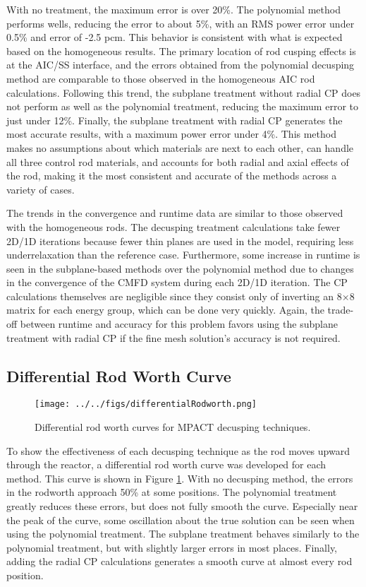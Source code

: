 With no treatment, the maximum error is over 20\%.  The polynomial method performs wells, reducing the error to about 5\%, with an RMS power error under 0.5\% and \keff{} error of -2.5 pcm.  This behavior is consistent with what is expected based on the homogeneous results.  The primary location of rod cusping effects is at the AIC/SS interface, and the errors obtained from the polynomial decusping method are comparable to those observed in the homogeneous AIC rod calculations.  Following this trend, the subplane treatment without radial CP does not perform as well as the polynomial treatment, reducing the maximum error to just under 12\%.  Finally, the subplane treatment with radial CP generates the most accurate results, with a maximum power error under 4\%.  This method makes no assumptions about which materials are next to each other, can handle all three control rod materials, and accounts for both radial and axial effects of the rod, making it the most consistent and accurate of the methods across a variety of cases.

The trends in the convergence and runtime data are similar to those observed with the homogeneous rods.  The decusping treatment calculations take fewer 2D/1D iterations because fewer thin planes are used in the model, requiring less underrelaxation than the reference case.  Furthermore, some increase in runtime is seen in the subplane-based methods over the polynomial method due to changes in the convergence of the CMFD system during each 2D/1D iteration.  The CP calculations themselves are negligible since they consist only of inverting an 8$\times$8 matrix for each energy group, which can be done very quickly.  Again, the trade-off between runtime and accuracy for this problem favors using the subplane treatment with radial CP if the fine mesh solution's accuracy is not required.

\subsection{Differential Rod Worth Curve}

\begin{figure}[h]
    \centering
    \texttt{[image: ../../figs/differentialRodworth.png]}
    \caption{Differential rod worth curves for MPACT decusping 
        techniques.}\label{f:rodworth}
\end{figure}

To show the effectiveness of each decusping technique as the rod moves upward through the reactor, a differential rod worth curve was developed for each method.  This curve is shown in Figure \ref{f:rodworth}.  With no decusping method, the errors in the rodworth approach 50\% at some positions.  The polynomial treatment greatly reduces these errors, but does not fully smooth the curve.  Especially near the peak of the curve, some oscillation about the true solution can be seen when using the polynomial treatment.  The subplane treatment behaves similarly to the polynomial treatment, but with slightly larger errors in most places.  Finally, adding the radial CP calculations generates a smooth curve at almost every rod position.

